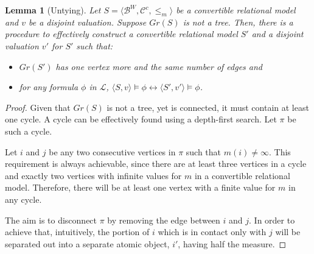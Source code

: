 \documentclass{article}
\newtheorem*{lemma}{Lemma}
\newcommand{\B}{\mathcal{B}}
\newcommand{\lang}{\mathcal{L}}
\begin{document}
\begin{lemma}[Untying]
  Let $S = \langle \B^W, \mathcal{C}^c, \leq_m \rangle$ be a convertible relational model and $v$ be a disjoint valuation. Suppose $Gr(S)$ is not a tree.
  Then, there is a procedure to effectively construct a convertible relational model $S'$ and a disjoint valuation $v'$ for $S'$ such that:
  \begin{itemize}
  \item $Gr(S')$ has one vertex more and the same number of edges and
  \item for any formula $\phi$ in $\lang$, $\langle S, v \rangle \models \phi \longleftrightarrow \langle S', v' \rangle \models \phi$.
  \end{itemize}
\end{lemma}
\begin{proof}
  Given that $Gr(S)$ is not a tree, yet is connected, it must contain at least one cycle. A cycle can be effectively found using a depth-first search. Let $\pi$ be such a cycle.

  Let $i$ and $j$ be any two consecutive vertices in $\pi$ such that $m(i) \neq \infty$. This requirement is always achievable, since there are at least three vertices in a cycle and exactly two vertices with infinite values for $m$ in a convertible relational model. Therefore, there will be at least one vertex with a finite value for $m$ in any cycle.

  The aim is to disconnect $\pi$ by removing the edge between $i$ and $j$. In order to achieve that, intuitively, the portion of $i$ which is in contact only with $j$ will be separated out into a separate atomic object, $i'$, having half the measure.


\end{proof}
\end{document}
